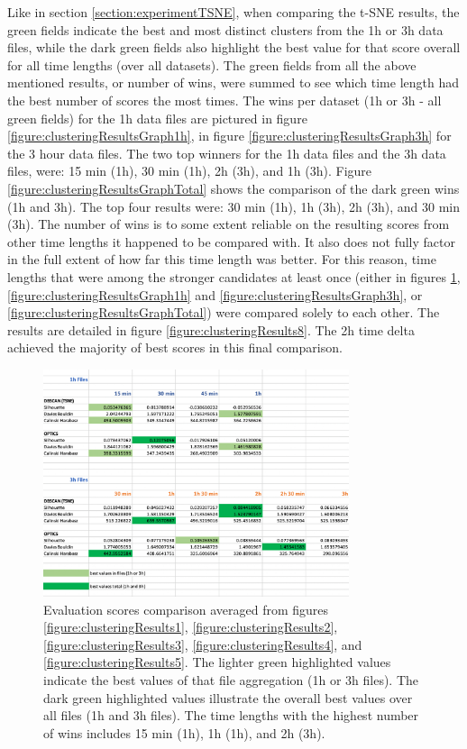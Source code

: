 Like in section \ref{section:experimentTSNE}, when comparing the t-SNE results, the green fields indicate the best and most distinct clusters from the 1h or 3h data files, while the dark green fields also highlight the best value for that score overall for all time lengths (over all datasets). The green fields from all the above mentioned results, or number of wins, were summed to see which time length had the best number of scores the most times. The wins per dataset (1h or 3h - all green fields) for the 1h data files are pictured in figure \ref{figure:clusteringResultsGraph1h}, in figure \ref{figure:clusteringResultsGraph3h} for the 3 hour data files. The two top winners for the 1h data files and the 3h data files, were: 15 min (1h), 30 min (1h), 2h (3h), and 1h (3h). Figure \ref{figure:clusteringResultsGraphTotal} shows the comparison of the dark green wins (1h and 3h). The top four results were: 30 min (1h), 1h (3h), 2h (3h), and 30 min (3h). The number of wins is to some extent reliable on the resulting scores from other time lengths it happened to be compared with. It also does not fully factor in the full extent of how far this time length was better. For this reason, time lengths that were among the stronger candidates at least once (either in figures \ref{figure:clusteringResults6}, \ref{figure:clusteringResultsGraph1h} and \ref{figure:clusteringResultsGraph3h}, or \ref{figure:clusteringResultsGraphTotal}) were compared solely to each other. The results are detailed in figure \ref{figure:clusteringResults8}. The 2h time delta achieved the majority of best scores in this final comparison. 

\begin{figure}
  \centering
  \includegraphics[width=0.8\textwidth]{./images/clusteringResults/clusteringResults6.png}
  \caption{Evaluation scores comparison averaged from figures \ref{figure:clusteringResults1}, \ref{figure:clusteringResults2}, \ref{figure:clusteringResults3}, \ref{figure:clusteringResults4}, and \ref{figure:clusteringResults5}. The lighter green highlighted values indicate the best values of that file aggregation (1h or 3h files). The dark green highlighted values illustrate the overall best values over all files (1h and 3h files). The time lengths with the highest number of wins includes 15 min (1h), 1h (1h), and 2h (3h). }
  \label{figure:clusteringResults6}
\end{figure}


